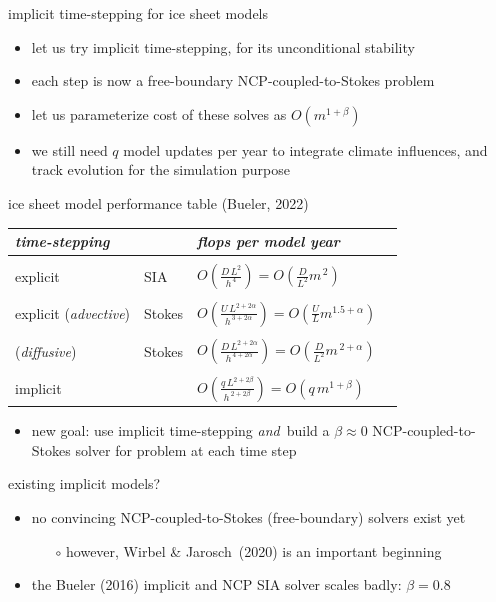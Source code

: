 \documentclass[svgnames,
               hyperref={colorlinks,citecolor=DeepPink4,linkcolor=FireBrick,urlcolor=Maroon},
               usepdftitle=false]  %
               {beamer}
\newcommand{\oo}[1]{\displaystyle O\left(#1\right)}
\begin{document}
\begin{frame}{implicit time-stepping for ice sheet models}

\begin{itemize}
\item let us try \alert{implicit time-stepping}, for its unconditional stability
\item each step is now a \alert{free-boundary NCP-coupled-to-Stokes problem}
\item let us parameterize cost of these solves as $O(m^{1+\beta})$
\item we still need $q$ model updates per year to integrate climate influences, and track evolution for the simulation purpose
\end{itemize}
\end{frame}


\begin{frame}{ice sheet model performance table (Bueler, 2022)}

\begin{tabular}{llll}
\emph{time-stepping} &  & \emph{flops per model year} \\ \hline
\\
explicit & SIA    & $\oo{\frac{D\, L^2}{h^{\,4}}} = \oo{\frac{D}{L^2} m^{\,2}}$ \\
\\
explicit ({\footnotesize \emph{advective}}) & Stokes \phantom{xxxx} & $\oo{\frac{U \,L^{2+2\alpha}}{h^{\,3+2\alpha}}} = \oo{\frac{U}{L} m^{1.5+\alpha}}$ \\
\\
\phantom{explicit} ({\footnotesize \emph{diffusive}})  & Stokes & $\oo{\frac{D\, L^{2+2\alpha}}{h^{\,4+2\alpha}}} = \oo{\frac{D}{L^2} m^{\,2+\alpha}}$ \\
\\
implicit & & $\oo{\frac{q\, L^{2+2\beta}}{h^{\,2+2\beta}}} = \oo{q\, m^{1+\beta}}$
\end{tabular}

\bigskip
\begin{itemize}
\item new goal: use implicit time-stepping \emph{and}~build a $\beta \approx 0$ NCP-coupled-to-Stokes solver for problem at each time step
\end{itemize}
\end{frame}


\begin{frame}{existing implicit models?}

\begin{itemize}
\item no convincing NCP-coupled-to-Stokes (free-boundary) solvers exist yet
    \begin{itemize}
    \item[$\circ$] however, Wirbel \& Jarosch~(2020) is an important beginning
    \end{itemize}
\item the Bueler (2016) implicit and NCP SIA solver scales badly: $\beta=0.8$
\end{itemize}
\end{frame}
\end{document}
